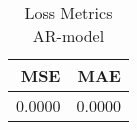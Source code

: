 \begin{table}
\caption{Loss Metrics AR-model}
\label{tab:loss_metrics_ar}
\begin{tabular}{rr}
\toprule
MSE & MAE \\
\midrule
0.0000 & 0.0000 \\
\bottomrule
\end{tabular}
\end{table}
